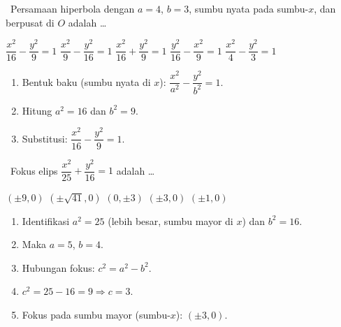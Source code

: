 \documentclass[11pt,a4paper]{exam}
\newenvironment{langkah}{%
  \begin{enumerate}[label=\textbf{Langkah \arabic*:},leftmargin=2.6em,
    itemsep=2pt,topsep=2pt]}{\end{enumerate}}
\newcommand{\Adv}{{\footnotesize\textsf{\textcolor{oranye}{[Advanced]}}}\ }
\newcommand{\Exp}{{\footnotesize\textsf{\textcolor{ungu}{[Expert]}}}\ }
\begin{document}
\begin{questions}
\question \Adv Persamaan hiperbola dengan $a=4$, $b=3$, sumbu nyata pada sumbu-$x$,
dan berpusat di $O$ adalah \dots
\begin{choices}
\CorrectChoice $\dfrac{x^{2}}{16} - \dfrac{y^{2}}{9} = 1$
\choice $\dfrac{x^{2}}{9} - \dfrac{y^{2}}{16} = 1$
\choice $\dfrac{x^{2}}{16} + \dfrac{y^{2}}{9} = 1$
\choice $\dfrac{y^{2}}{16} - \dfrac{x^{2}}{9} = 1$
\choice $\dfrac{x^{2}}{4} - \dfrac{y^{2}}{3} = 1$
\end{choices}
\begin{solution}
\begin{langkah}
\item Bentuk baku (sumbu nyata di $x$): $\dfrac{x^{2}}{a^{2}} - \dfrac{y^{2}}{b^{2}} = 1$.
\item Hitung $a^{2} = 16$ dan $b^{2} = 9$.
\item Substitusi: $\dfrac{x^{2}}{16} - \dfrac{y^{2}}{9} = 1$.
\end{langkah}
\end{solution}

\question \Exp Fokus elips $\dfrac{x^{2}}{25} + \dfrac{y^{2}}{16} = 1$ adalah \dots
\begin{choices}
\choice $(\pm 9, 0)$ \choice $(\pm\sqrt{41}, 0)$ \choice $(0, \pm 3)$
\CorrectChoice $(\pm 3, 0)$ \choice $(\pm 1, 0)$
\end{choices}
\begin{solution}
\begin{langkah}
\item Identifikasi $a^{2}=25$ (lebih besar, sumbu mayor di $x$) dan $b^{2}=16$.
\item Maka $a=5$, $b=4$.
\item Hubungan fokus: $c^{2} = a^{2} - b^{2}$.
\item $c^{2} = 25 - 16 = 9 \Rightarrow c = 3$.
\item Fokus pada sumbu mayor (sumbu-$x$): $(\pm 3, 0)$.
\end{langkah}
\end{solution}

\end{questions}
\end{document}
